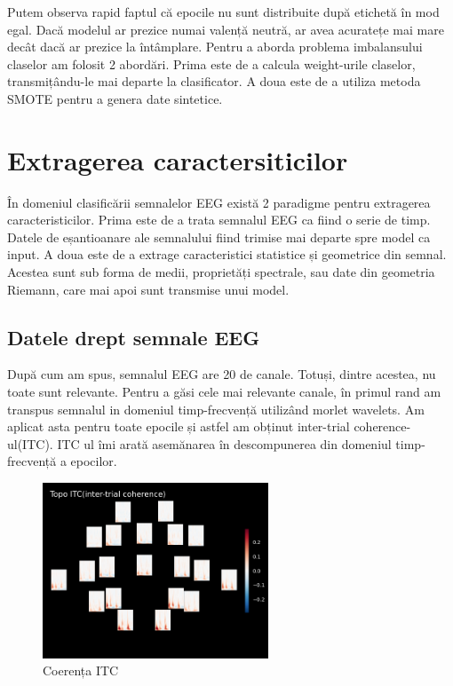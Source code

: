 Putem observa rapid faptul că epocile nu sunt distribuite după etichetă în mod egal. Dacă modelul ar prezice numai valență neutră, ar avea acuratețe mai mare decât dacă ar prezice la întâmplare. Pentru a aborda problema imbalansului claselor am folosit 2 abordări. Prima este de a calcula weight-urile claselor, transmițându-le mai departe la clasificator. A doua este de a utiliza metoda SMOTE\cite{imblearn} pentru a genera date sintetice.

\section{Extragerea caractersiticilor}
În domeniul clasificării semnalelor EEG există 2 paradigme pentru extragerea caracteristicilor. Prima este de a trata semnalul EEG ca fiind o serie de timp. Datele de eșantioanare ale semnalului fiind trimise mai departe spre model ca input. A doua este de a extrage caracteristici statistice și geometrice din semnal. Acestea sunt sub forma de medii, proprietăți spectrale, sau date din geometria Riemann, care mai apoi sunt transmise unui model.

\subsection{Datele drept semnale EEG}
După cum am spus, semnalul EEG are 20 de canale. Totuși, dintre acestea, nu toate sunt relevante. Pentru a găsi cele mai relevante canale, în primul rand am transpus semnalul in domeniul timp-frecvență utilizând morlet wavelets. Am aplicat asta pentru toate epocile și astfel am obținut inter-trial coherence-ul(ITC). ITC ul îmi arată asemănarea în descompunerea din domeniul timp-frecvență a epocilor.

\setlength{\abovecaptionskip}{0pt}
\setlength{\belowcaptionskip}{0pt}
\clearpage
\begin{figure}[h]
    \centering
    \includegraphics[width=0.6\textwidth]{images/itc_epochs.png}
    \caption{Coerența ITC}
    \label{fig:enter-label}
\end{figure}

